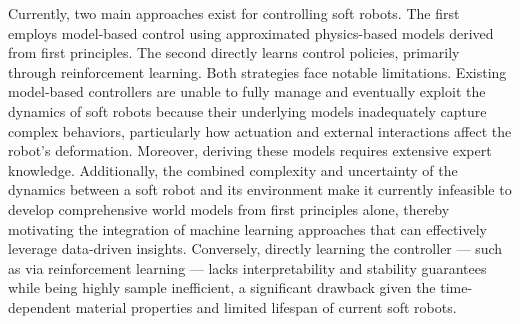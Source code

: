 Currently, two main approaches exist for controlling soft robots. The first employs model-based control using approximated physics-based models derived from first principles. The second directly learns control policies, primarily through reinforcement learning. Both strategies face notable limitations. Existing model-based controllers are unable to fully manage and eventually exploit the dynamics of soft robots because their underlying models inadequately capture complex behaviors, particularly how actuation and external interactions affect the robot’s deformation. Moreover, deriving these models requires extensive expert knowledge. Additionally, the combined complexity and uncertainty of the dynamics between a soft robot and its environment make it currently infeasible to develop comprehensive world models from first principles alone, thereby motivating the integration of machine learning approaches that can effectively leverage data-driven insights. Conversely, directly learning the controller — such as via reinforcement learning — lacks interpretability and stability guarantees while being highly sample inefficient, a significant drawback given the time-dependent material properties and limited lifespan of current soft robots.

